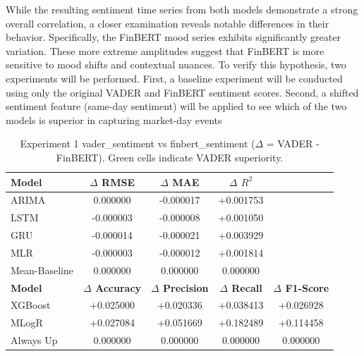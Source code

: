 \documentclass[Master,english,IEEE]{twbook}
\begin{document}
While the resulting sentiment time series from both models demonstrate a strong overall correlation, a closer examination reveals notable differences in their behavior. Specifically, the FinBERT mood series exhibits significantly greater variation. These more extreme amplitudes suggest that FinBERT is more sensitive to mood shifts and contextual nuances. To verify this hypothesis, two experiments will be performed. First, a baseline experiment will be conducted using only the original VADER and FinBERT sentiment scores. Second, a shifted sentiment feature (same-day sentiment) will be applied to see which of the two models is superior in capturing market-day events

\begin{table}[H]
    \centering
    \small %
    \setlength{\tabcolsep}{4pt} %
    \begin{tabular}{|lcccc|}
        \hline
        \textbf{Model} & \textbf{$\Delta$ RMSE} & \textbf{$\Delta$ MAE} & \textbf{$\Delta$ $R^2$} & \\
        \hline
        ARIMA          &  0.000000                      & \cellcolor{green!25}-0.000017 & \cellcolor{green!25}+0.001753 & \\
        LSTM           & \cellcolor{green!25}-0.000003  & \cellcolor{green!25}-0.000008 & \cellcolor{green!25}+0.001050 & \\
        GRU            & \cellcolor{green!25}-0.000014  & \cellcolor{green!25}-0.000021 & \cellcolor{green!25}+0.003929 & \\
        MLR            & \cellcolor{green!25}-0.000003  & \cellcolor{green!25}-0.000012 & \cellcolor{green!25}+0.001814 & \\
        Mean-Baseline  &  0.000000                      &  0.000000                     &  0.000000                     & \\
        \hline
        \textbf{Model} & \textbf{$\Delta$ Accuracy} & \textbf{$\Delta$ Precision} & \textbf{$\Delta$ Recall} & \textbf{$\Delta$ F1-Score} \\
        \hline
        XGBoost        & \cellcolor{green!25}+0.025000  & \cellcolor{green!25}+0.020336 & \cellcolor{green!25}+0.038413 & \cellcolor{green!25}+0.026928 \\
        MLogR          & \cellcolor{green!25}+0.027084  & \cellcolor{green!25}+0.051669 & \cellcolor{green!25}+0.182489 & \cellcolor{green!25}+0.114458 \\
        Always Up      &  0.000000                      &  0.000000                     &  0.000000                     &  0.000000                     \\
        \hline
    \end{tabular}
    \caption{Experiment 1 vader\_sentiment vs finbert\_sentiment ($\Delta$ = VADER - FinBERT). Green cells indicate VADER superiority.}
    \label{tab:vader_advantage}
\end{table}
\end{document}
